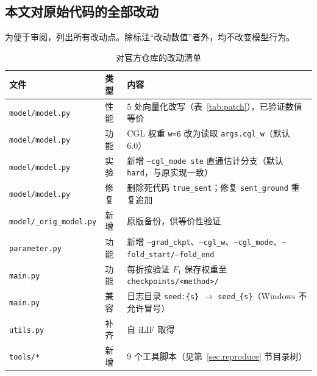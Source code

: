 \subsection{本文对原始代码的全部改动}

为便于审阅，列出所有改动点。除标注“改动数值”者外，均不改变模型行为。

\begin{table}[H]
\centering
\caption{对官方仓库的改动清单}
\label{tab:changes}
\small
\begin{tabularx}{\textwidth}{@{}l l X@{}}
\toprule
文件 & 类型 & 内容\\
\midrule
\texttt{model/model.py} & 性能 & 5 处向量化改写（表~\ref{tab:patch}），已验证数值等价\\
\texttt{model/model.py} & 功能 & CGL 权重 \texttt{w=6} 改为读取 \texttt{args.cgl\_w}（默认 6.0）\\
\texttt{model/model.py} & 实验 & 新增 \texttt{--cgl\_mode ste} 直通估计分支（默认 \texttt{hard}，与原实现一致）\\
\texttt{model/model.py} & 修复 & 删除死代码 \texttt{true\_sent}；修复 \texttt{sent\_ground} 重复追加\\
\texttt{model/\_orig\_model.py} & 新增 & 原版备份，供等价性验证\\
\texttt{parameter.py} & 功能 & 新增 \texttt{--grad\_ckpt}、\texttt{--cgl\_w}、\texttt{--cgl\_mode}、\texttt{--fold\_start/--fold\_end}\\
\texttt{main.py} & 功能 & 每折按验证 $F_1$ 保存权重至 \texttt{checkpoints/<method>/}\\
\texttt{main.py} & 兼容 & 日志目录 \texttt{seed:\{s\}} $\to$ \texttt{seed\_\{s\}}（Windows 不允许冒号）\\
\texttt{utils.py} & 补齐 & 自 iLIF 取得\\
\texttt{tools/*} & 新增 & 9 个工具脚本（见第~\ref{sec:reproduce} 节目录树）\\
\bottomrule
\end{tabularx}
\end{table}
